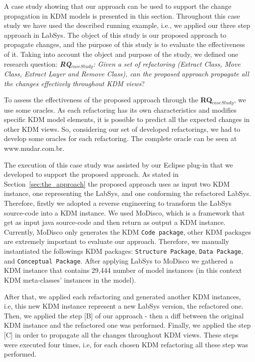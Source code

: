 
A case study showing that our approach can be used to support the change propagation in KDM models is presented in this section. Throughout this case study we have used the described running example, i.e., we applied our three step approach in LabSys.
The object of this study is our proposed approach to propagate changes, and the purpose of this study is to evaluate the effectiveness of it. Taking into account the object and purpose of the study, we defined one research question:
\textit{ \textbf{RQ$_{caseStudy}$}: Given a set of refactoring (\textit{Extract Class}, \textit{Move Class}, \textit{Extract Layer} and \textit{Remove Class}),
can the proposed approach propagate all the changes effectively throughout KDM views}?


To assess the effectiveness of the proposed approach through the \textbf{RQ$_{caseStudy}$}, we use some oracles. As each refactoring has its own characteristics and modifies specific KDM model elements, it is possible to predict all the expected changes in other KDM views. So, considering our set of developed refactorings, we had to develop some oracles for each refactoring. The complete oracle can be seen at www.mudar.com.br.

The execution of this case study was assisted by our Eclipse plug-in that we developed to support the proposed approach. As stated in Section~\ref{sec:the_approach} the proposed approach uses as input two KDM instance, one representing the LabSys, and one conforming the refactored LabSys. Therefore, firstly we adopted a reverse engineering to transform the LabSys source-code into a KDM instance. We used MoDisco\cite{Brunele20141012}, which is a framework that get as input java source-code and then return as output a KDM instance. Currently, MoDisco only generates the KDM \texttt{Code package}, other KDM packages are extremely important to evaluate our approach. Therefore, we manually instantiated the followings KDM packages: \texttt{Structure Package}, \texttt{Data Package}, and \texttt{Conceptual Package}. After applying LabSys to MoDisco we gathered a KDM instance that contains 29,444 number of model instances (in this context KDM meta-classes' instances in the model). %

After that, we applied each refactoring and generated another KDM instances, i.e, this new KDM instance represent a new LabSys version, the refactored one. Then, we applied the step [B] of our approach - then a diff between the original KDM instance and the refactored one was performed. Finally, we applied the step [C] in order to propagate all the changes throughout KDM views. These steps were executed four times, i.e, for each chosen KDM refactoring all these step was performed.

